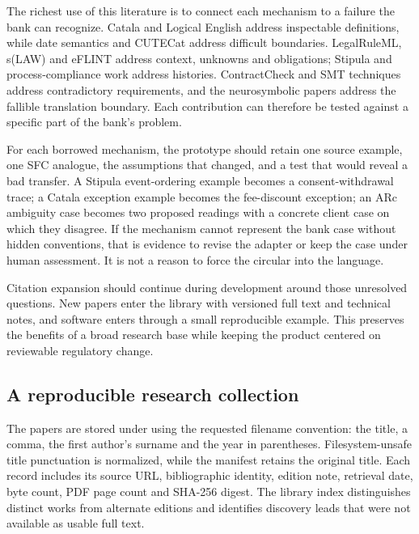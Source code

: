 \documentclass[12pt,a4paper,oneside,openany]{book}
\begin{document}
The richest use of this literature is to connect each mechanism to a failure the
bank can recognize. Catala and Logical English address inspectable definitions,
while date semantics and CUTECat address difficult boundaries. LegalRuleML,
s(LAW) and eFLINT address context, unknowns and obligations; Stipula and
process-compliance work address histories. ContractCheck and SMT techniques
address contradictory requirements, and the neurosymbolic papers address the
fallible translation boundary. Each contribution can therefore be tested against
a specific part of the bank's problem.

For each borrowed mechanism, the prototype should retain one source example,
one SFC analogue, the assumptions that changed, and a test that would reveal a
bad transfer. A Stipula event-ordering example becomes a consent-withdrawal trace;
a Catala exception example becomes the fee-discount exception; an ARc ambiguity
case becomes two proposed readings with a concrete client case on which they
disagree. If the mechanism cannot represent the bank case without hidden
conventions, that is evidence to revise the adapter or keep the case under human
assessment. It is not a reason to force the circular into the language.

Citation expansion should continue during development around those unresolved
questions. New papers enter the library with versioned full text and technical
notes, and software enters through a small reproducible example. This preserves
the benefits of a broad research base while keeping the product centered on
reviewable regulatory change.

\subsection{A reproducible research collection}
\label{merge:P-05-evidence:02}


The papers are stored under  using the requested filename
convention: the title, a comma, the first author's surname and the year in
parentheses. Filesystem-unsafe title punctuation is normalized, while the manifest
retains the original title. Each
record includes its source URL, bibliographic identity, edition note, retrieval
date, byte count, PDF page count and SHA-256 digest. The library index distinguishes
distinct works from alternate editions and identifies discovery leads that were
not available as usable full text.
\end{document}
